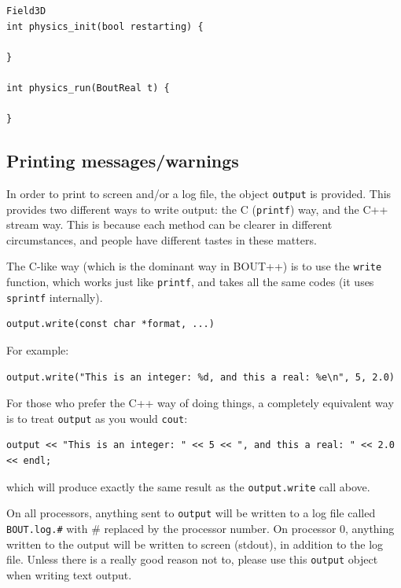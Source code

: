 \documentclass[12pt]{article}
\newcommand{\code}[1]{\texttt{#1}}
\begin{document}
\begin{lstlisting}
Field3D 
int physics_init(bool restarting) {
  
}

int physics_run(BoutReal t) {
  
}
\end{lstlisting}

\subsection{Printing messages/warnings}
\label{sec:printing}

In order to print to screen and/or a log file, the object \code{output} is provided. 
This provides two different ways to write output: the C (\code{printf}) way, and the
C++ stream way. This is because each method can be clearer in different circumstances,
and people have different tastes in these matters. 

The C-like way (which is the dominant way in BOUT++) is to use the \code{write} function,
which works just like \code{printf}, and takes all the same codes (it uses \code{sprintf}
internally). 
\begin{lstlisting}
output.write(const char *format, ...)
\end{lstlisting}
For example:
\begin{lstlisting}
output.write("This is an integer: %d, and this a real: %e\n", 5, 2.0)
\end{lstlisting}

For those who prefer the C++ way of doing things, a completely equivalent way is to
treat \code{output} as you would \code{cout}:
\begin{lstlisting}
output << "This is an integer: " << 5 << ", and this a real: " << 2.0 << endl;
\end{lstlisting}
which will produce exactly the same result as the \code{output.write} call above.

On all processors, anything sent to \code{output} will be written to a log file called
\texttt{BOUT.log.\#} with \# replaced by the processor number. On processor 0, anything
written to the output will be written to screen (stdout), in addition to the log file.
Unless there is a really good reason not to, please use this \code{output} object 
when writing text output.
\end{document}
